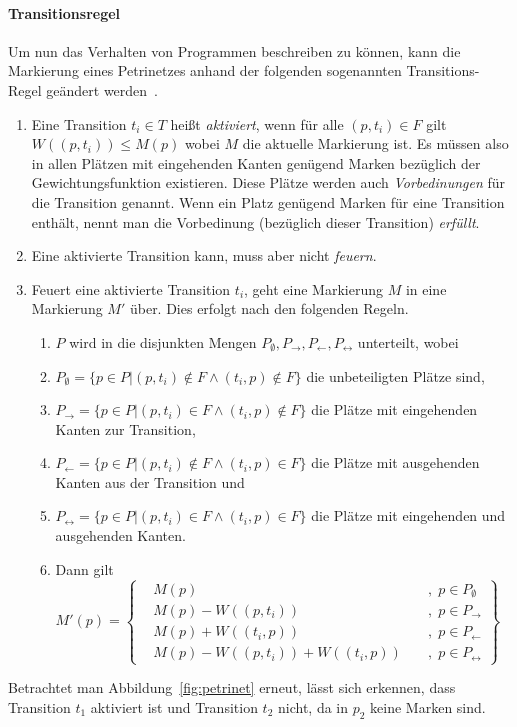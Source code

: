 \paragraph{Transitionsregel} Um nun das Verhalten von Programmen beschreiben zu können, kann die Markierung eines Petrinetzes anhand der folgenden sogenannten Transitions-Regel geändert werden~\cite{Murata1989}.
\begin{enumerate}
	\item Eine Transition $t_i \in T$ heißt \emph{aktiviert}, wenn für alle $(p,t_i) \in F $ gilt $ W((p,t_i)) \leq M(p)$ wobei $M$ die aktuelle Markierung ist. Es müssen also in allen Plätzen mit eingehenden Kanten genügend Marken bezüglich der Gewichtungsfunktion existieren. Diese Plätze werden auch \emph{Vorbedinungen} für die Transition genannt. Wenn ein Platz genügend Marken für eine Transition enthält, nennt man die Vorbedinung (bezüglich dieser Transition) \emph{erfüllt}.
	\item Eine aktivierte Transition kann, muss aber nicht \emph{feuern}.
	\item Feuert eine aktivierte Transition $t_i$, geht eine Markierung $M$ in eine Markierung $M'$ über. Dies erfolgt nach den folgenden Regeln.
	\begin{enumerate}
		\item $P$ wird in die disjunkten Mengen $P_\emptyset, P_\rightarrow, P_\leftarrow, P_\leftrightarrow$ unterteilt, wobei 
		\item $P_\emptyset = \{p \in P | (p,t_i) \notin F \land (t_i,p) \notin F\}$ die unbeteiligten Plätze sind,
		\item $P_\rightarrow = \{p \in P | (p,t_i) \in F \land (t_i,p) \notin F\}$ die Plätze mit eingehenden Kanten zur Transition,
		\item $P_\leftarrow = \{p \in P | (p,t_i) \notin F \land (t_i,p) \in F\}$ die Plätze mit ausgehenden Kanten aus der Transition und 
		\item $P_\leftrightarrow = \{p \in P | (p,t_i) \in F \land (t_i,p) \in F\}$ die Plätze mit eingehenden und ausgehenden Kanten.
		\item Dann gilt $
			M'(p) = \left\{ 
				\begin{aligned}
					& M(p) && \; , \; p \in P_\emptyset\\
					& M(p)-W((p,t_i)) && \; , \; p \in P_\rightarrow\\
					&M(p)+W((t_i,p)) && \; , \; p \in P_\leftarrow\\
					& M(p)-W((p,t_i))+W((t_i,p)) && \; , \; p \in P_\leftrightarrow
				\end{aligned}
				\right\}
		$
	\end{enumerate}
\end{enumerate}
Betrachtet man Abbildung~\ref{fig:petrinet} erneut, lässt sich erkennen, dass Transition $t_1$ aktiviert ist und Transition $t_2$ nicht, da in $p_2$ keine Marken sind.

